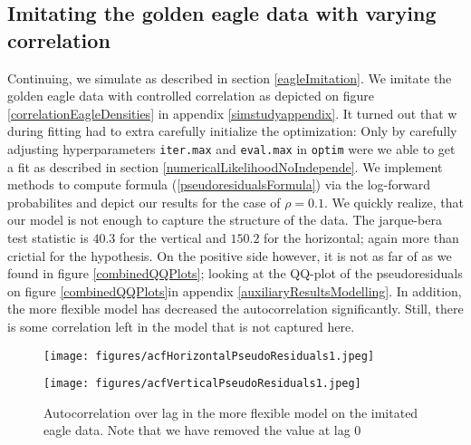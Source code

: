 \subsection{Imitating the golden eagle data with varying correlation}
Continuing, we simulate as described in section \ref{eagleImitation}. We imitate the golden eagle data with controlled correlation as depicted on figure \ref{correlationEagleDensities} in appendix \ref{simstudyappendix}. It turned out that w during fitting had to extra carefully initialize the optimization: Only by carefully adjusting hyperparameters \texttt{iter.max} and \texttt{eval.max} in \texttt{optim} \cite{RLang} were we able to get a fit as described in section \ref{numericalLikelihoodNoIndepende}. We implement methods to compute formula (\ref{pseudoresidualsFormula}) via the log-forward probabilites and depict our results for the case of $\rho = 0.1$. We quickly realize, that our model is not enough to capture the structure of the data. The jarque-bera test statistic is $40.3$ for the vertical and $150.2$ for the horizontal; again more than crictial for the hypothesis. On the positive side however, it is not as far of as we found in figure \ref{combinedQQPlots}; looking at the QQ-plot of the pseudoresiduals on figure \ref{combinedQQPlots}in appendix \ref{auxiliaryResultsModelling}. In addition, the more flexible model has decreased the autocorrelation significantly. Still, there is some correlation left in the model that is not captured here.
\begin{figure}[ht]
  \centering
  \begin{minipage}[b]{0.4\textwidth}
    \texttt{[image: figures/acfHorizontalPseudoResiduals1.jpeg]}
  \end{minipage}
  \hspace{0.03\textwidth}
  \begin{minipage}[b]{0.4\textwidth}
    \texttt{[image: figures/acfVerticalPseudoResiduals1.jpeg]}
  \end{minipage}
  \caption{Autocorrelation over lag in the more flexible model on the imitated eagle data.
  Note that we have removed the value at lag 0}
  \label{combinedACFPlotsImitated}
\end{figure}
